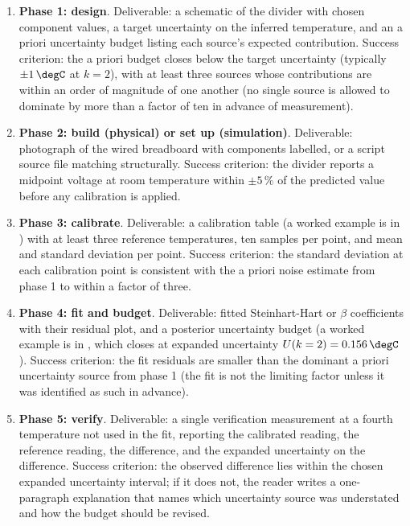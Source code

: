 \begin{project}
\begin{enumerate}[leftmargin=*]
  \item \textbf{Phase 1: design}. Deliverable: a schematic of the
    divider with chosen component values, a target uncertainty on
    the inferred temperature, and an a priori uncertainty budget
    listing each source's expected contribution. Success
    criterion: the a priori budget closes below the target
    uncertainty (typically $\pm 1 \,\degC$ at $k = 2$), with at
    least three sources whose contributions are within an order of
    magnitude of one another (no single source is allowed to
    dominate by more than a factor of ten in advance of
    measurement).
  \item \textbf{Phase 2: build (physical) or set up (simulation)}.
    Deliverable: photograph of the wired breadboard with
    components labelled, or a script source file matching
     structurally. Success
    criterion: the divider reports a midpoint voltage at room
    temperature within $\pm 5\,\%$ of the predicted value before
    any calibration is applied.
  \item \textbf{Phase 3: calibrate}. Deliverable: a calibration
    table (a worked example is in
    ) with at
    least three reference temperatures, ten samples per point, and
    mean and standard deviation per point. Success criterion: the
    standard deviation at each calibration point is consistent
    with the a priori noise estimate from phase 1 to within a
    factor of three.
  \item \textbf{Phase 4: fit and budget}. Deliverable: fitted
    Steinhart-Hart or $\beta$ coefficients with their residual
    plot, and a posterior uncertainty budget (a worked example is
    in , which closes
    at expanded uncertainty $U(k = 2) = 0.156 \,\degC$). Success
    criterion: the fit residuals are smaller than the dominant
    a priori uncertainty source from phase 1 (the fit is not the
    limiting factor unless it was identified as such in advance).
  \item \textbf{Phase 5: verify}. Deliverable: a single verification
    measurement at a fourth temperature not used in the fit,
    reporting the calibrated reading, the reference reading, the
    difference, and the expanded uncertainty on the difference.
    Success criterion: the observed difference lies within the
    chosen expanded uncertainty interval; if it does not, the
    reader writes a one-paragraph explanation that names which
    uncertainty source was understated and how the budget should
    be revised.
\end{enumerate}


\end{project}
